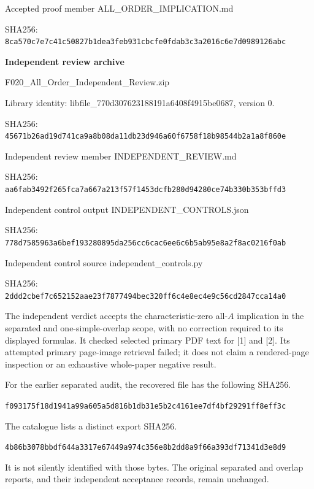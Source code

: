 \documentclass[
  11pt,
]{article}
\begin{document}
Accepted proof member ALL\_ORDER\_IMPLICATION.md

SHA256:
\texttt{8ca570c7e7c41c50827b1dea3feb931cbcfe0fdab3c3a2016c6e7d0989126abc}

\textbf{Independent review archive}

F020\_All\_Order\_Independent\_Review.zip

Library identity: libfile\_770d307623188191a6408f4915be0687, version 0.

SHA256:
\texttt{45671b26ad19d741ca9a8b08da11db23d946a60f6758f18b98544b2a1a8f860e}

Independent review member INDEPENDENT\_REVIEW.md

SHA256:
\texttt{aa6fab3492f265fca7a667a213f57f1453dcfb280d94280ce74b330b353bffd3}

Independent control output INDEPENDENT\_CONTROLS.json

SHA256:
\texttt{778d7585963a6bef193280895da256cc6cac6ee6c6b5ab95e8a2f8ac0216f0ab}

Independent control source independent\_controls.py

SHA256:
\texttt{2ddd2cbef7c652152aae23f7877494bec320ff6c4e8ec4e9c56cd2847cca14a0}

The independent verdict accepts the characteristic-zero all-\(A\)
implication in the separated and one-simple-overlap scope, with no
correction required to its displayed formulas. It checked selected
primary PDF text for {[}1{]} and {[}2{]}. Its attempted primary
page-image retrieval failed; it does not claim a rendered-page
inspection or an exhaustive whole-paper negative result.

For the earlier separated audit, the recovered file has the following
SHA256.

\texttt{f093175f18d1941a99a605a5d816b1db31e5b2c4161ee7df4bf29291ff8eff3c}

The catalogue lists a distinct export SHA256.

\texttt{4b86b3078bbdf644a3317e67449a974c356e8b2dd8a9f66a393df71341d3e8d9}

It is not silently identified with those bytes. The original separated
and overlap reports, and their independent acceptance records, remain
unchanged.
\end{document}
